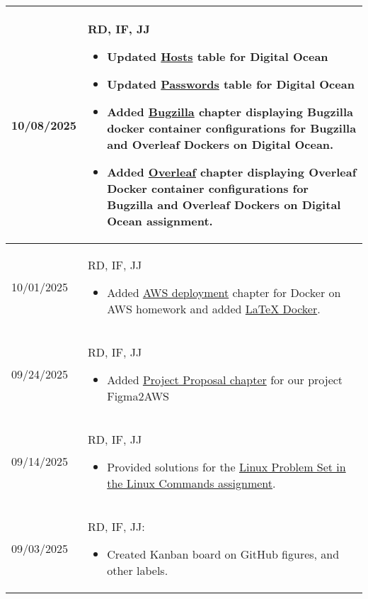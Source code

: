 \begin{longtable}{|l||p{13.5cm}|}
10/08/2025 & RD, IF, JJ
\begin{itemize}[topsep=0pt,itemsep=0pt,parsep=0pt,partopsep=0pt,leftmargin=12pt]
    \item Updated \hyperref[Chapter::Hosts]{Hosts} table for Digital Ocean
    \item Updated \hyperref[Chapter::Passwords]{Passwords} table for Digital Ocean
    \item Added \hyperref[Chapter::Bugzilla]{Bugzilla} chapter displaying Bugzilla docker container configurations for Bugzilla and Overleaf Dockers on Digital Ocean.
    \item Added \hyperref[Chapter!Overleaf]{Overleaf} chapter displaying Overleaf Docker container configurations for Bugzilla and Overleaf Dockers on Digital Ocean assignment.

    \end{itemize}
\\ \hline

10/01/2025 & RD, IF, JJ
\begin{itemize}[topsep=0pt,itemsep=0pt,parsep=0pt,partopsep=0pt,leftmargin=12pt]
    \item Added \hyperref[Chapter::AWSDeployment]{AWS deployment} chapter for Docker on AWS homework and added \hyperref[Chapter::LaTeXDocker]{LaTeX Docker}.
\end{itemize}
\\ \hline

09/24/2025 & RD, IF, JJ
\begin{itemize}[topsep=0pt,itemsep=0pt,parsep=0pt,partopsep=0pt,leftmargin=12pt]
    \item Added \hyperref[chap:pproposal]{Project Proposal chapter} for our project Figma2AWS
\end{itemize}
\\ \hline

09/14/2025 & RD, IF, JJ
\begin{itemize}[topsep=0pt,itemsep=0pt,parsep=0pt,partopsep=0pt,leftmargin=12pt]
    \item Provided solutions for the \hyperref[chap:linux]{Linux Problem Set in the Linux Commands assignment}.
\end{itemize}
\\ \hline

09/03/2025 & RD, IF, JJ:
\begin{itemize}[topsep=0pt,itemsep=0pt,parsep=0pt,partopsep=0pt,leftmargin=12pt]
\item Created Kanban board on GitHub 
figures, and other labels.
\end{itemize} 
\\ \hline





\end{longtable}


